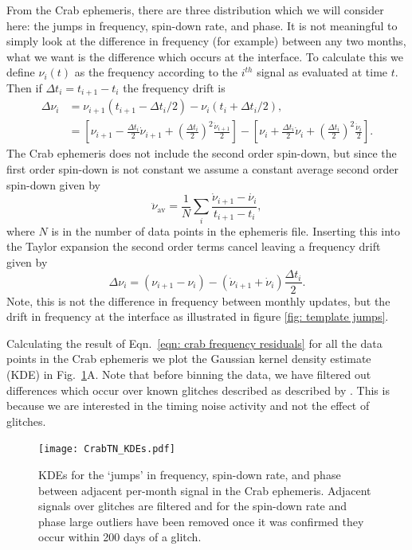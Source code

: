 \documentclass[../full_thesis/full_thesis.tex]{subfiles}
\begin{document}
\begin{subappendices}
From the Crab ephemeris, there are three distribution which
we will consider here: the jumps in
frequency, spin-down rate, and phase. It is not meaningful to simply look at
the difference in frequency (for example) between any two months, what we want
is the difference which occurs at the interface. To calculate this
we define $\nu_{i}(t)$ as the frequency according to the
$i^{th}$ signal as evaluated at time $t$. Then if $\Delta t_{i} = t_{i+1} -
t_{i}$ the frequency drift is
\begin{align}
\Delta\nu_{i} &= \nu_{i+1}\left(t_{i+1}-\Delta t_{i}/2\right) -  \nu_{i}\left(t_{i}+\Delta t_{i}/2\right), \\
    &= \left[\nu_{i+1}- \frac{\Delta t_{i}}{2}\dot{\nu}_{i+1} + \left(\frac{\Delta t_{i}}{2}\right)^{2}\frac{\ddot{\nu}_{i+1}}{2}\right]
     - \left[\nu_{i} + \frac{\Delta t_{i}}{2}\dot{\nu}_{i}+ \left(\frac{\Delta t_{i}}{2}\right)^{2}\frac{\ddot{\nu}_{i}}{2}\right] .
\end{align}
The Crab ephemeris does not include the second order spin-down, but since the
first order spin-down is not constant we assume a constant average second order
spin-down given by
\newcommand{\nuddotav}{\ddot{\nu}_{\textrm{av}}}
\begin{equation}
   \nuddotav = \frac{1}{N}\sum_{i} \frac{\dot{\nu}_{i+1} - \dot{\nu_{i}}}{t_{i+1} - t_{i}},
   \label{eqn: average second order spin-down}
\end{equation}
where $N$ is in the number of data points in the ephemeris file. Inserting this
into the Taylor expansion the second order terms cancel leaving a frequency
drift given by
\begin{equation}
\Delta\nu_{i} = \left(\nu_{i+1}- \nu_{i}\right) -  \left(\dot{\nu}_{i+1}
               + \dot{\nu}_{i}\right)\frac{\Delta t_{i}}{2}.
\label{eqn: crab frequency residuals}
\end{equation}
Note, this is not the difference in frequency between monthly
updates, but the drift in frequency at the interface as illustrated in figure
\ref{fig: template jumps}.

Calculating the result of Eqn.~\eqref{eqn: crab frequency residuals} for all
the data points in the Crab ephemeris we plot the Gaussian kernel density
estimate (KDE) in Fig.~\ref{fig: crab kde}A.  Note that before binning the
data, we have filtered out differences which occur over known glitches
described as described by \citet{Espinoza2011}. This is because we are
interested in the timing noise activity and not the effect of glitches.
\begin{figure}[ht]
\centering
\texttt{[image: CrabTN\_KDEs.pdf]}
\caption{KDEs for the `jumps' in frequency, spin-down rate, and phase between
         adjacent per-month signal in the Crab ephemeris. Adjacent signals over
         glitches are filtered and for the spin-down rate and
         phase large outliers have been removed once it was confirmed they
         occur within 200 days of a glitch.}
\label{fig: crab kde}
\end{figure}


\end{subappendices}
\end{document}
